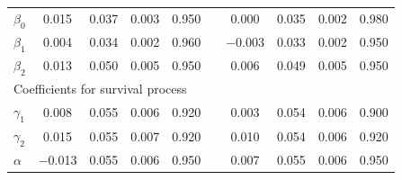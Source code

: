 \documentclass[10pt]{beamer}
\begin{document}
\begin{frame}[allowframebreaks]
\begin{table}[H]
{\begin{tabular}{lccccccccc}
  $\beta_0$ & 0.015 & 0.037 & 0.003 & 0.950 & & 0.000 & 0.035 & 0.002 & 0.980 \\
  $\beta_{1}$ & 0.004 & 0.034 & 0.002 & 0.960 & & $-$0.003 & 0.033 & 0.002 & 0.950\\
  $\beta_{2}$ & 0.013 & 0.050 & 0.005 & 0.950 & & 0.006 & 0.049 & 0.005 & 0.950 \\
  \multicolumn{10}{l}{Coefficients for survival process} \\
  $\gamma_1$ & 0.008 & 0.055 & 0.006 & 0.920 & & 0.003 & 0.054 & 0.006 & 0.900 \\
  $\gamma_2$ & 0.015 & 0.055 & 0.007 & 0.920 & & 0.010 & 0.054 & 0.006 & 0.920 \\
  $\alpha$ & $-$0.013 & 0.055 & 0.006 & 0.950 & & 0.007 & 0.055 & 0.006 & 0.950 \\
   \hline
\end{tabular}
}
\end{table}
\end{frame}





\end{document}
